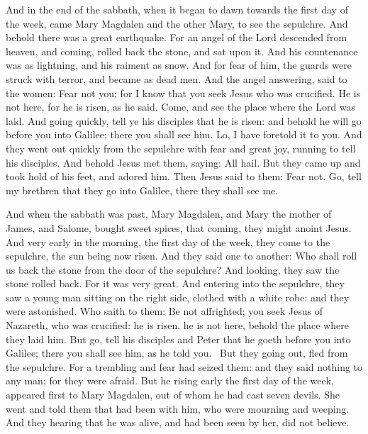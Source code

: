 And in the end of the sabbath, when it began to dawn towards the first day of the week, came Mary Magdalen and the other
Mary, to see the sepulchre. And behold there was a great earthquake. For an angel of the Lord descended from heaven,
and coming, rolled back the stone, and sat upon it. And his countenance was as lightning, and his raiment as snow. And
for fear of him, the guards were struck with terror, and became as dead men. And the angel answering, said to the
women: Fear not you; for I know that you seek Jesus who was crucified. He is not here, for he is risen, as he said.
Come, and see the place where the Lord was laid. And going quickly, tell ye his disciples that he is risen: and behold
he will go before you into Galilee; there you shall see him. Lo, I have foretold it to you. And they went out quickly
from the sepulchre with fear and great joy, running to tell his disciples. And behold Jesus met them, saying: All hail.
But they came up and took hold of his feet, and adored him. Then Jesus said to them: Fear not. Go, tell my brethren
that they go into Galilee, there they shall see me.

And when the sabbath was past, Mary Magdalen, and Mary the mother of James, and Salome, bought sweet spices, that
coming, they might anoint Jesus. And very early in the morning, the first day of the week, they come to the sepulchre,
the sun being now risen. And they said one to another: Who shall roll us back the stone from the door of the sepulchre?
And looking, they saw the stone rolled back. For it was very great. And entering into the sepulchre, they saw a young
man sitting on the right side, clothed with a white robe: and they were astonished. Who saith to them: Be not
affrighted; you seek Jesus of Nazareth, who was crucified: he is risen, he is not here, behold the place where they
laid him. But go, tell his disciples and Peter that he goeth before you into Galilee; there you shall see him, as he
told you.  But they going out, fled from the sepulchre. For a trembling and fear had seized them: and they said nothing
to any man; for they were afraid. But he rising early the first day of the week, appeared first to Mary Magdalen, out
of whom he had cast seven devils. She went and told them that had been with him, who were mourning and weeping. And
they hearing that he was alive, and had been seen by her, did not believe.

